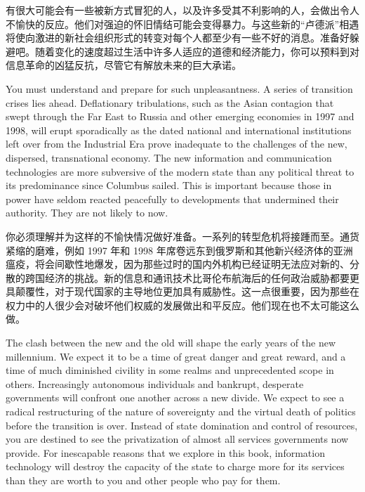\begin{Parallel}{97mm}{45mm}
  \ParallelRText
  {\small 有很大可能会有一些被新方式冒犯的人，以及许多受其不利影响的人，会做出令人不愉快的反应。他们对强迫的怀旧情结可能会变得暴力。与这些新的“卢德派”相遇将使向激进的新社会组织形式的转变对每个人都至少有一些不好的消息。准备好躲避吧。随着变化的速度超过生活中许多人适应的道德和经济能力，你可以预料到对信息革命的凶猛反抗，尽管它有解放未来的巨大承诺。
  }

\ParallelPar  

  \ParallelLText
  {You must understand and prepare for such unpleasantness. A series of transition crises lies ahead. Deflationary tribulations, such as the Asian contagion that swept through the Far East to Russia and other emerging economies in 1997 and 1998, will erupt sporadically as the dated national and international institutions left over from the Industrial Era prove inadequate to the challenges of the new, dispersed, transnational economy. The new information and communication technologies are more subversive of the modern state than any political threat to its predominance since Columbus sailed. This is important because those in power have seldom reacted peacefully to developments that undermined their authority. They are not likely to now. 
  }
  
  \ParallelRText
  {\small 你必须理解并为这样的不愉快情况做好准备。一系列的转型危机将接踵而至。通货紧缩的磨难，例如 1997 年和 1998 年席卷远东到俄罗斯和其他新兴经济体的亚洲瘟疫，将会间歇性地爆发，因为那些过时的国内外机构已经证明无法应对新的、分散的跨国经济的挑战。新的信息和通讯技术比哥伦布航海后的任何政治威胁都要更具颠覆性，对于现代国家的主导地位更加具有威胁性。这一点很重要，因为那些在权力中的人很少会对破坏他们权威的发展做出和平反应。他们现在也不太可能这么做。
  }
\ParallelPar  

  \ParallelLText
  {The clash between the new and the old will shape the early years of the new millennium. We expect it to be a time of great danger and great reward, and a time of much diminished civility in some realms and unprecedented scope in others. Increasingly autonomous individuals and bankrupt, desperate governments will confront one another across a new divide. We expect to see a radical restructuring of the nature of sovereignty and the virtual death of politics before the transition is over. Instead of state domination and control of resources, you are destined to see the privatization of almost all services governments now provide. For inescapable reasons that we explore in this book, information technology will destroy the capacity of the state to charge more for its services than they are worth to you and other people who pay for them.  
  }
  

\end{Parallel}
